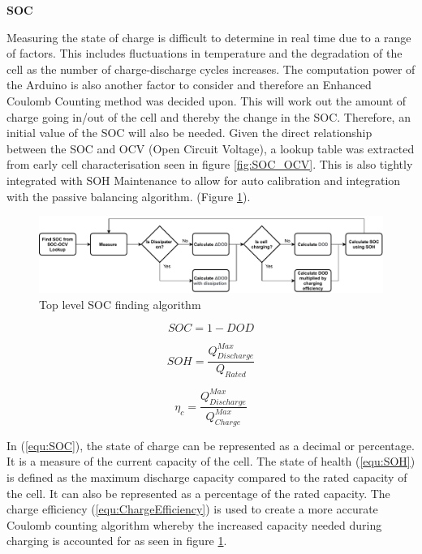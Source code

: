 \documentclass[10pt,twoside]{article}
\begin{document}
\textbf{SOC}

Measuring the state of charge is difficult to determine in real time due to a range of factors. This includes fluctuations in temperature and the degradation of the cell as the number of charge-discharge cycles increases. The computation power of the Arduino is also another factor to consider and therefore an Enhanced Coulomb Counting method \cite{Ng2009EnhancedBatteries} was decided upon. This will work out the amount of charge going in/out of the cell and thereby the change in the SOC. Therefore, an initial value of the SOC will also be needed. Given the direct relationship between the SOC and OCV (Open Circuit Voltage), a lookup table was extracted from early cell characterisation seen in figure \ref{fig:SOC_OCV}. This is also tightly integrated with SOH Maintenance to allow for auto calibration and integration with the passive balancing algorithm. (Figure \ref{fig:SOCFlow}). 

\begin{figure}[hbt]
    \centering
    \includegraphics[scale = 0.65]{ColoumbCounting (2).pdf}
    \caption{Top level SOC finding algorithm}
    \label{fig:SOCFlow}
\end{figure}


\noindent\begin{minipage}{.32\linewidth}
\begin{equation}
    SOC = 1 - DOD
  \label{equ:SOC}
\end{equation}
\end{minipage}
\begin{minipage}{.32\linewidth}
\begin{equation}
    SOH = \frac{Q_{Discharge}^{Max}}{Q_{Rated}}
  \label{equ:SOH}
\end{equation}
\end{minipage}
\begin{minipage}{.32\linewidth}
\begin{equation}
    \eta_c = \frac{Q_{Discharge}^{Max}}{Q_{Charge}^{Max}}
  \label{equ:ChargeEfficiency}
\end{equation}
\end{minipage}

In (\ref{equ:SOC}), the state of charge can be represented as a decimal or percentage. It is a measure of the current capacity of the cell. The state of health (\ref{equ:SOH}) is defined as the maximum discharge capacity compared to the rated capacity of the cell. It can also be represented as a percentage of the rated capacity. The charge efficiency (\ref{equ:ChargeEfficiency}) is used to create a more accurate Coulomb counting algorithm whereby the increased capacity needed during charging is accounted for as seen in figure \ref{fig:SOCFlow}.   
\end{document}
